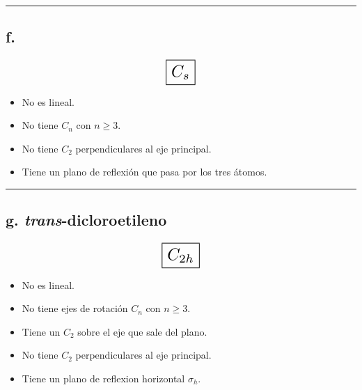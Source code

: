 \iffalse
No es lineal.
No tiene $C_n$ con $n \geq 3$.
Tiene $C_2$.
No tiene $C_2$ perpendiculares al eje principal.
Tiene plano $\sigma_h$.

C_2h
\fi

\begin{center}
    \rule{15cm}{0.4pt}
\end{center}


\subsection*{f.}

\[ \scalebox{1.7}{$\boxed{C_s}$} \]

\begin{itemize}
    \item No es lineal.
    \item No tiene $C_n$ con $n \geq 3$.
    \item No tiene $C_2$ perpendiculares al eje principal.
    \item Tiene un plano de reflexión que pasa por los tres átomos.
\end{itemize}

\iffalse
No es lineal.
No tiene $C_n$ con $n \geq 3$.
No tiene $C_2$ perpendiculares al eje principal.
Tiene un plano de reflexión que pasa por los tres átomos.

C_s
\fi

\begin{center}
    \rule{15cm}{0.4pt}
\end{center}


\subsection*{g. \textit{trans}-dicloroetileno}

\[ \scalebox{1.7}{$\boxed{C_{2h}}$} \]

\begin{itemize}
    \item No es lineal.
    \item No tiene ejes de rotación $C_n$ con $n \geq 3$.
    \item Tiene un $C_2$ sobre el eje que sale del plano.
    \item No tiene $C_2$ perpendiculares al eje principal.
    \item Tiene un plano de reflexion horizontal $\sigma_h$.
\end{itemize}

